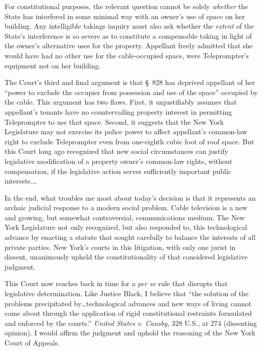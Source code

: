 For constitutional purposes, the relevant question cannot be solely
\textit{whether} the State has interfered in some minimal way with an owner's
use of space on her building. Any intelligible takings inquiry must also ask
whether the \textit{extent} of the State's interference is so severe as to
constitute a compensable taking in light of the owner's alternative uses for the
property. Appellant freely admitted that she would have had no other use for the
cable-occupied space, were Teleprompter's equipment not on her building. 

The Court's third and final argument is that \S~828 has deprived appellant of
her ``power to exclude the occupier from possession and use of the space''
occupied by the cable. This argument has two flaws. First, it unjustifiably
assumes that appellant's tenants have no countervailing property interest in
permitting Teleprompter to use that space. Second, it suggests that the New York
Legislature may not exercise its police power to affect appellant's common-law
right to exclude Teleprompter even from one-eighth cubic foot of roof space. But
this Court long ago recognized that new social circumstances can justify
legislative modification of a property owner's common-law rights, without
compensation, if the legislative action serves sufficiently important public
interests.\ldots

In the end, what troubles me most about today's decision is that it represents
an archaic judicial response to a modern social problem. Cable television is a
new and growing, but somewhat controversial, communications medium. The New York
Legislature not only recognized, but also responded to, this technological
advance by enacting a statute that sought carefully to balance the interests of
all private parties. New York's courts in this litigation, with only one jurist
in dissent, unanimously upheld the constitutionality of that considered
legislative judgment.

This Court now reaches back in time for a \textit{per se} rule that disrupts
that legislative determination. Like Justice Black, I believe that ``the
solution of the problems precipitated by\ldots technological advances and new
ways of living cannot come about through the application of rigid constitutional
restraints formulated and enforced by the courts.'' \textit{United States v.
Causby}, 328 U.S., at 274 (dissenting opinion). I would affirm the judgment and
uphold the reasoning of the New York Court of Appeals.

